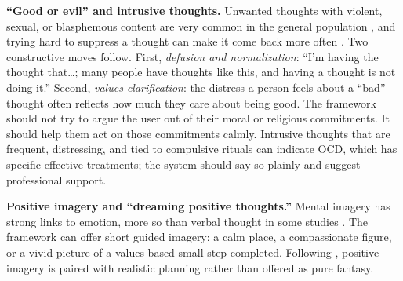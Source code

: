 \documentclass[11pt]{article}
\begin{document}
\textbf{``Good or evil'' and intrusive thoughts.} Unwanted thoughts with violent, sexual, or blasphemous content are very common in the general population \citep{rachman1978}, and trying hard to suppress a thought can make it come back more often \citep{wegner1987}. Two constructive moves follow. First, \emph{defusion and normalization}: ``I'm having the thought that\ldots; many people have thoughts like this, and having a thought is not doing it.'' Second, \emph{values clarification}: the distress a person feels about a ``bad'' thought often reflects how much they care about being good. The framework should not try to argue the user out of their moral or religious commitments. It should help them act on those commitments calmly. Intrusive thoughts that are frequent, distressing, and tied to compulsive rituals can indicate OCD, which has specific effective treatments; the system should say so plainly and suggest professional support.

\textbf{Positive imagery and ``dreaming positive thoughts.''} Mental imagery has strong links to emotion, more so than verbal thought in some studies \citep{holmes2010}. The framework can offer short guided imagery: a calm place, a compassionate figure, or a vivid picture of a values-based small step completed. Following \citet{oettingen2014}, positive imagery is paired with realistic planning rather than offered as pure fantasy.
\end{document}
